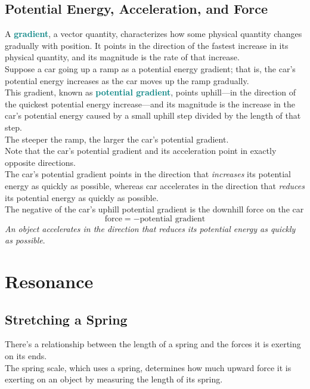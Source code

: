 \documentclass[12pt]{article}
\theoremstyle{definition}
\newcommand{\defnterm}[1]{\textbf{\textcolor{teal}{#1}}\index{#1}}
\begin{document}
\subsection{Potential Energy, Acceleration, and Force}
A \defnterm{gradient}, a vector quantity, characterizes how some physical quantity changes gradually with position.
It points in the direction of the fastest increase in its physical quantity, and its magnitude is the rate of that increase. \\

Suppose a car going up a ramp as a potential energy gradient;
that is, the car's potential energy increases as the car moves up the ramp gradually. \\
This gradient, known as \defnterm{potential gradient}, points uphill---in the direction of the quickest potential energy increase---and its magnitude is the increase in the car's potential energy caused by a small uphill step divided by the length of that step. \\
The steeper the ramp, the larger the car's potential gradient. \\

Note that the car's potential gradient and its acceleration point in exactly opposite directions. \\
The car's potential gradient points in the direction that \emph{increases} its potential energy as quickly as possible, whereas car accelerates in the direction that \emph{reduces} its potential energy as quickly as possible. \\
The negative of the car's uphill potential gradient is the downhill force on the car
$$\text{force} = -\text{potential gradient}$$
\emph{An object accelerates in the direction that reduces its potential energy as quickly as possible}.


\newpage
\section{Resonance}
\subsection{Stretching a Spring}
There's a relationship between the length of a spring and the forces it is exerting on its ends. \\
The spring scale, which uses a spring, determines how much upward force it is exerting on an object by measuring the length of its spring. \\
\end{document}
